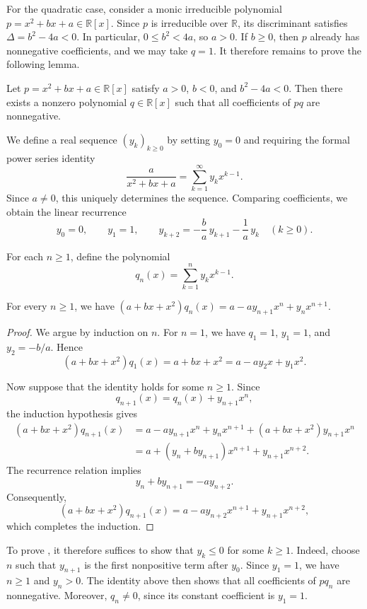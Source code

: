 \documentclass[a4paper,11pt]{article}
\newcommand{\RR}{\mathbb{R}}
\begin{document}
	For the quadratic case, consider a monic irreducible polynomial
	$p=x^2+bx+a\in\RR[x]$. Since $p$ is irreducible over $\RR$, its
	discriminant satisfies
	$
	\Delta=b^2-4a<0.
	$
	In particular, $0\leq b^2<4a$, so $a>0$. If $b\geq0$, then $p$
	already has nonnegative coefficients, and we may take $q=1$.
	It therefore remains to prove the following lemma.
	
	\begin{lemma}\label{quadratic-case}
		Let $p=x^2+bx+a\in\RR[x]$ satisfy $a>0$, $b<0$, and
		$b^2-4a<0$. Then there exists a nonzero polynomial
		$q\in\RR[x]$ such that all coefficients of $pq$ are nonnegative.
	\end{lemma}
	
	We define a real sequence $(y_k)_{k\geq0}$ by setting $y_0=0$ and
	requiring the formal power series identity
	\[
	\frac{a}{x^2+bx+a}
	= \sum_{k=1}^{\infty} y_k x^{k-1}.
	\]
	Since $a\neq0$, this uniquely determines the sequence.
	Comparing coefficients, we obtain the linear recurrence
	\[
	y_0=0,\qquad
	y_1=1,\qquad
	y_{k+2}=-\frac ba\,y_{k+1}-\frac1a\,y_k
	\quad(k\geq0).
	\]
	
	For each $n\geq1$, define the polynomial
	$$
	q_n(x)=\sum_{k=1}^{n}y_kx^{k-1}.
	$$
	
	\begin{lemma}\label{pq-product}
		For every $n\geq1$, we have
		$
		(a+bx+x^2)q_n(x)
		=a-ay_{n+1}x^n+y_nx^{n+1}.
		$
	\end{lemma}
	
	\begin{proof}
		We argue by induction on $n$. For $n=1$, we have $q_1=1$,
		$y_1=1$, and $y_2=-b/a$. Hence
		\[
		(a+bx+x^2)q_1(x)
		=a+bx+x^2
		=a-ay_2x+y_1x^2.
		\]
		
		Now suppose that the identity holds for some $n\geq1$.
		Since
		\[
		q_{n+1}(x)=q_n(x)+y_{n+1}x^n,
		\]
		the induction hypothesis gives
		\begin{align*}
			(a+bx+x^2)q_{n+1}(x)
			&=a-ay_{n+1}x^n+y_nx^{n+1}
			+(a+bx+x^2)y_{n+1}x^n\\
			&=a+(y_n+by_{n+1})x^{n+1}
			+y_{n+1}x^{n+2}.
		\end{align*}
		The recurrence relation implies
		\[
		y_n+by_{n+1}=-ay_{n+2}.
		\]
		Consequently,
		\[
		(a+bx+x^2)q_{n+1}(x)
		=a-ay_{n+2}x^{n+1}+y_{n+1}x^{n+2},
		\]
		which completes the induction.
	\end{proof}
	
	To prove , it therefore suffices to show that
	$y_k\leq0$ for some $k\geq1$. Indeed, choose $n$ such that $y_{n+1}$
	is the first nonpositive term after $y_0$. Since $y_1=1$, we have
	$n\geq1$ and $y_n>0$. The identity above then shows that all
	coefficients of $pq_n$ are nonnegative. Moreover, $q_n\neq0$,
	since its constant coefficient is $y_1=1$.
	
\end{document}
